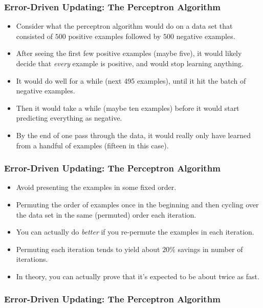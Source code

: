 \documentclass[trans]{beamer}
\begin{document}
\begin{frame}
  \frametitle{Error-Driven Updating: The Perceptron Algorithm}
\begin{itemize}
\item
Consider what the perceptron algorithm would do on a data set that
consisted of $500$ positive examples followed by $500$ negative
examples.
\item  After seeing the first few positive examples (maybe five),
it would likely decide that \emph{every} example is positive, and
would stop learning anything. 
\item  It would do well for a while (next 495
examples), until it hit the batch of negative examples. 
\item  Then it would
take a while (maybe ten examples) before it would start predicting
everything as negative. 
\item  By the end of one pass through the data, it
would really only have learned from a handful of examples (fifteen in
this case).
\end{itemize}
\end{frame}

\begin{frame}
  \frametitle{Error-Driven Updating: The Perceptron Algorithm}
\begin{itemize}
\item
Avoid presenting the examples in some
fixed order. 
\item Permuting the order
of examples once in the beginning and then cycling over the data set
in the same (permuted) order each iteration. 
\item You can actually do \emph{better} if you re-permute the examples
in each iteration.  
\item Permuting each
iteration tends to yield about $20\%$ savings in number of iterations.
\item In theory, you can actually prove that it's expected to be about twice
as fast.
\end{itemize}
\end{frame}

\begin{frame}
  \frametitle{Error-Driven Updating: The Perceptron Algorithm}
\end{frame}
\end{document}
